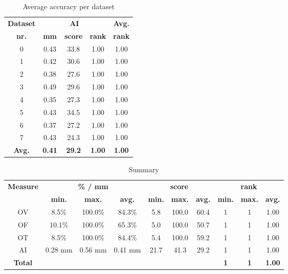\begin{table*}
\scriptsize
\caption{Average accuracy per dataset}
\centering
\begin{tabular}{|c|ccc|c|}
\hline
\multicolumn{1}{|c|}{\textbf{Dataset}} &\multicolumn{3}{c|}{\textbf{AI}} &\multicolumn{1}{c|}{\textbf{Avg.}} \\
\multicolumn{1}{|c|}{\textbf{nr.}} &\multicolumn{1}{c|}{\textbf{mm}} &\multicolumn{1}{c|}{\textbf{score}} &\multicolumn{1}{c|}{\textbf{rank}} &\multicolumn{1}{c|}{\textbf{rank}}\\
\hline
0&0.43&33.8& 1.00& 1.00\\
1&0.42&30.6& 1.00& 1.00\\
2&0.38&27.6& 1.00& 1.00\\
3&0.49&29.6& 1.00& 1.00\\
4&0.35&27.3& 1.00& 1.00\\
5&0.43&34.5& 1.00& 1.00\\
6&0.37&27.2& 1.00& 1.00\\
7&0.43&24.3& 1.00& 1.00\\
\hline
\textbf{Avg.}&\textbf{0.41}&\textbf{29.2}&\textbf{ 1.00}&\textbf{ 1.00}\\
\hline
\end{tabular}
\vspace{-0.3cm}
\label{}
\normalsize
\end{table*}

\begin{table*}
\scriptsize
\caption{Summary}
\centering
\begin{tabular}{|c|ccc|ccc|ccc|}
\hline
\multicolumn{1}{|c|}{\textbf{Measure}} &\multicolumn{3}{c|}{\textbf{\% / mm}} &\multicolumn{3}{c|}{\textbf{score}} &\multicolumn{3}{c|}{\textbf{rank}} \\
\multicolumn{1}{|c|}{\textbf{}} &\multicolumn{1}{c|}{\textbf{min.}} &\multicolumn{1}{c|}{\textbf{max.}} &\multicolumn{1}{c|}{\textbf{avg.}} &\multicolumn{1}{c|}{\textbf{min.}} &\multicolumn{1}{c|}{\textbf{max.}} &\multicolumn{1}{c|}{\textbf{avg.}} &\multicolumn{1}{c|}{\textbf{min.}} &\multicolumn{1}{c|}{\textbf{max.}} &\multicolumn{1}{c|}{\textbf{avg.}}\\
\hline
OV& 8.5\%&100.0\%&84.3\%& 5.8&100.0&60.4&1&1& 1.00\\
OF&10.1\%&100.0\%&65.3\%& 5.0&100.0&50.7&1&1& 1.00\\
OT& 8.5\%&100.0\%&84.4\%& 5.4&100.0&59.2&1&1& 1.00\\
AI&0.28 mm&0.56 mm&0.41 mm&21.7&41.3&29.2&1&1& 1.00\\
\hline
\textbf{Total}&\textbf{}&\textbf{}&\textbf{}&\textbf{}&\textbf{}&\textbf{}&\textbf{1}&\textbf{1}&\textbf{ 1.00}\\
\hline
\end{tabular}
\vspace{-0.3cm}
\label{}
\normalsize
\end{table*}

